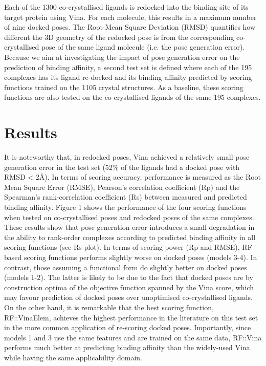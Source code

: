 Each of the 1300 co-crystallised ligands is redocked into the binding site of its target protein using Vina. For each molecule, this results in a maximum number of nine docked poses. The Root-Mean Square Deviation (RMSD) quantifies how different the 3D geometry of the redocked pose is from the corresponding co-crystallised pose of the same ligand molecule (i.e. the pose generation error). Because we aim at investigating the impact of pose generation error on the prediction of binding affinity, a second test set is defined where each of the 195 complexes has its ligand re-docked and its binding affinity predicted by scoring functions trained on the 1105 crystal structures. As a baseline, these scoring functions are also tested on the co-crystallised ligands of the same 195 complexes.

\section{Results}

It is noteworthy that, in redocked poses, Vina achieved a relatively small pose generation error in the test set (52\% of the ligands had a docked pose with RMSD < 2\AA). In terms of scoring accuracy, performance is measured as the Root Mean Square Error (RMSE), Pearson’s correlation coefficient (Rp) and the Spearman’s rank-correlation coefficient (Rs) between measured and predicted binding affinity. Figure 1 shows the performance of the four scoring functions when tested on co-crystallised poses and redocked poses of the same complexes. These results show that pose generation error introduces a small degradation in the ability to rank-order complexes according to predicted binding affinity in all scoring functions (see Rs plot). In terms of scoring power (Rp and RMSE), RF-based scoring functions performs slightly worse on docked poses (models 3-4). In contrast, those assuming a functional form do slightly better on docked poses (models 1-2). The latter is likely to be due to the fact that docked poses are by construction optima of the objective function spanned by the Vina score, which may favour prediction of docked poses over unoptimised co-crystallised ligands. On the other hand, it is remarkable that the best scoring function, RF::VinaElem, achieves the highest performance in the literature on this test set in the more common application of re-scoring docked poses. Importantly, since models 1 and 3 use the same features and are trained on the same data, RF::Vina performs much better at predicting binding affinity than the widely-used Vina while having the same applicability domain.

